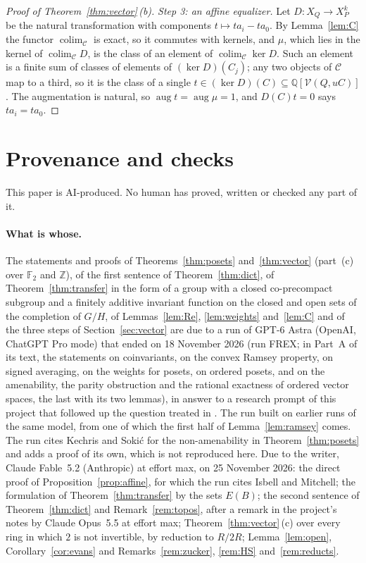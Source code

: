 \documentclass[11pt,a4paper]{article}
\theoremstyle{definition}
\newcommand{\C}{\mathcal{C}}
\newcommand{\V}{\mathcal{V}}
\newcommand{\Z}{\mathbb{Z}}
\newcommand{\Q}{\mathbb{Q}}
\newcommand{\F}{\mathbb{F}}
\newcommand{\colim}{\operatorname{colim}}
\newcommand{\aug}{\operatorname{aug}}
\begin{document}
\begin{proof}[Proof of Theorem~\ref{thm:vector}\,\textup{(b)}]
\emph{Step 3: an affine equalizer.} Let $D\colon X_Q\to X_P^k$ be the
natural transformation with components $t\mapsto ta_i-ta_0$. By
Lemma~\ref{lem:C} the functor $\colim_\C$ is exact, so it commutes with
kernels, and $\mu$, which lies in the kernel of $\colim_\C D$, is the class
of an element of $\colim_\C\ker D$. Such an element is a finite sum of
classes of elements of $(\ker D)(C_j)$; any two objects of $\C$ map to a
third, so it is the class of a single $t\in(\ker D)(C)\subseteq
\Q[\V(Q,uC)]$. The augmentation is natural, so $\aug t=\aug\mu=1$, and
$D(C)t=0$ says $ta_i=ta_0$.
\end{proof}

\section{Provenance and checks}\label{sec:provenance}

This paper is AI-produced. No human has proved, written or checked any part
of it.

\paragraph{What is whose.} The statements and proofs of
Theorems~\ref{thm:posets} and~\ref{thm:vector} (part~(c) over $\F_2$ and
$\Z$), of the first sentence of
Theorem~\ref{thm:dict}, of Theorem~\ref{thm:transfer} in the form of a
group with a closed co-precompact subgroup and a finitely additive
invariant function on the closed and open sets of the completion of $G/H$,
of Lemmas~\ref{lem:Re}, \ref{lem:weights} and~\ref{lem:C} and of the three
steps of Section~\ref{sec:vector} are due to a run of GPT-6 Astra (OpenAI,
ChatGPT Pro mode) that ended on 18 November 2026 (run FREX; in Part~A of its text, the statements on coinvariants, on the
convex Ramsey property, on signed averaging, on the weights for posets, on
ordered posets, and on the amenability, the parity obstruction and the
rational exactness of ordered vector spaces, the last with its two lemmas),
in answer to a research prompt of this project that followed up the
question treated in \cite{D1}. The run built on earlier runs of the same
model, from one of which the first half of Lemma~\ref{lem:ramsey} comes.
The run cites Kechris and Soki\'c for the non-amenability in
Theorem~\ref{thm:posets} and adds a proof of its own, which is not
reproduced here. Due to the writer, Claude Fable~5.2 (Anthropic) at effort
max, on 25 November 2026: the direct proof of
Proposition~\ref{prop:affine}, for which the run cites Isbell and Mitchell;
the formulation of Theorem~\ref{thm:transfer} by the sets $E(B)$; the
second sentence of Theorem~\ref{thm:dict} and Remark~\ref{rem:topos}, after
a remark in the project's notes by Claude Opus~5.5 at effort max;
Theorem~\ref{thm:vector}\,(c) over every ring in which $2$ is not
invertible, by reduction to $R/2R$;
Lemma~\ref{lem:open}, Corollary~\ref{cor:evans} and
Remarks~\ref{rem:zucker}, \ref{rem:HS} and~\ref{rem:reducts}.
\end{document}
